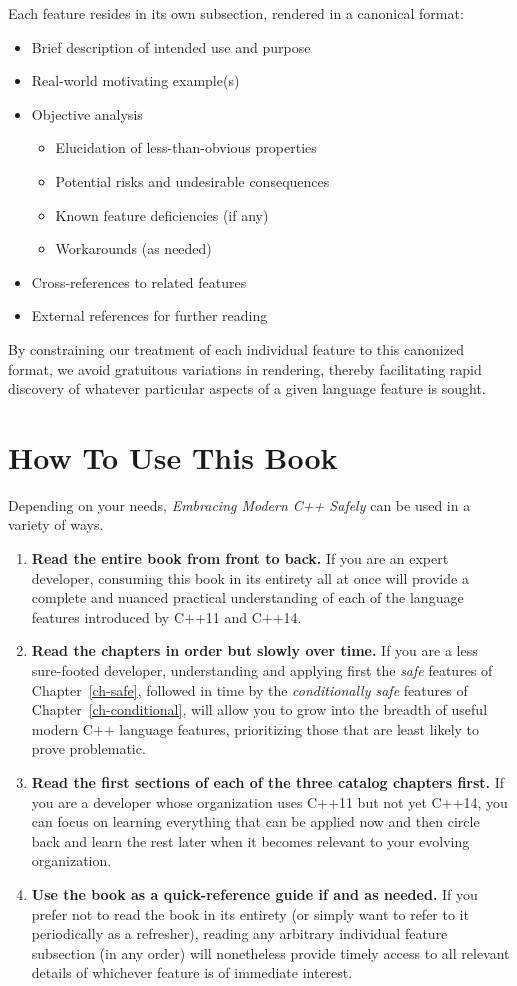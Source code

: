 Each feature resides in its own subsection, rendered in a canonical format:
\begin{itemize}
\item{Brief description of intended use and purpose}
\item{Real-world motivating example(s)}
\item{Objective analysis}
\begin{itemize}
\item{Elucidation of less-than-obvious properties}
\item{Potential risks and undesirable consequences}
\item{Known feature deficiencies (if any)}
\item{Workarounds (as needed)}
\end{itemize}
\item{Cross-references to related features}
\item{External references for further reading}
\end{itemize}
By constraining our treatment of each individual feature to this canonized format, we avoid gratuitous variations in rendering, thereby facilitating rapid discovery of whatever particular aspects of a given language feature is sought. 

\section[How To Use This Book]{How To Use This Book}

Depending on your needs, \textit{Embracing Modern C++ Safely} can be used in a variety of ways.
\begin{enumerate}
\item{\textbf{Read the entire book from front to back.} If you are an expert developer, consuming this book in its entirety all at once will provide a complete and nuanced practical understanding of each of the language features introduced by C++11 and C++14.}
\item{\textbf{Read the chapters in order but slowly over time.} If you are a less sure-footed developer, understanding and applying first the \textit{safe} features of Chapter~\ref{ch-safe}, followed in time by the \textit{conditionally safe} features of Chapter~\ref{ch-conditional}, will allow you to grow into the breadth of useful modern C++ language features, prioritizing those that are least likely to prove problematic.}
\item{\textbf{Read the first sections of each of the three catalog chapters first.} If you are a developer whose organization uses C++11 but not yet C++14, you can focus on learning everything that can be applied now and then circle back and learn the rest later when it becomes relevant to your evolving organization.}
\item{\textbf{Use the book as a quick-reference guide if and as needed.} If you prefer not to read the book in its entirety (or simply want to refer to it periodically as a refresher), reading any arbitrary individual feature subsection (in any order) will nonetheless provide timely access to all relevant details of whichever feature is of immediate interest.}
\end{enumerate}


